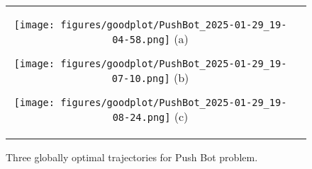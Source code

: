 
\begin{figure}[htbp]
    \centering
    \begin{minipage}{\columnwidth}
        \centering
        \begin{tabular}{cc}
            \begin{minipage}{0.3\columnwidth}
                \centering
                \texttt{[image: figures/goodplot/PushBot\_2025-01-29\_19-04-58.png]}
                (a)
            \end{minipage}

            \begin{minipage}{0.3\columnwidth}
                \centering
                \texttt{[image: figures/goodplot/PushBot\_2025-01-29\_19-07-10.png]}
                (b)
            \end{minipage}

            \begin{minipage}{0.3\columnwidth}
                \centering
                \texttt{[image: figures/goodplot/PushBot\_2025-01-29\_19-08-24.png]}
                (c)
            \end{minipage}
        \end{tabular}
    \end{minipage}

    \caption{Three globally optimal trajectories for Push Bot problem. \label{fig:exp:PushBot}}
\end{figure}